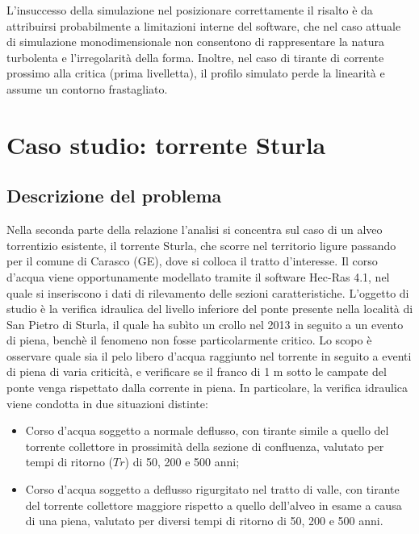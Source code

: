 \documentclass[12pt]{article} %
\begin{document}
\noindent L’insuccesso della simulazione nel posizionare correttamente il risalto è da attribuirsi probabilmente a limitazioni interne del software, che nel caso attuale di simulazione monodimensionale non consentono di rappresentare la natura turbolenta e l'irregolarità della forma. Inoltre, nel caso di tirante di corrente prossimo alla critica (prima livelletta), il profilo simulato perde la linearità e assume un contorno frastagliato.

\newpage

\section{Caso studio: torrente Sturla}
\subsection{Descrizione del problema}
\noindent Nella seconda parte della relazione l’analisi si concentra sul caso di un alveo torrentizio esistente, il torrente Sturla, che scorre nel territorio ligure passando per il comune di Carasco (GE), dove si colloca il tratto d’interesse. Il corso d’acqua viene opportunamente modellato tramite il software Hec-Ras 4.1, nel quale si inseriscono i dati di rilevamento delle sezioni caratteristiche.
L’oggetto di studio è la verifica idraulica del livello inferiore del ponte presente nella località di San Pietro di Sturla, il quale ha subìto un crollo nel 2013 in seguito a un evento di piena, benchè il fenomeno non fosse particolarmente critico. Lo scopo è osservare quale sia il pelo libero d’acqua raggiunto nel torrente in seguito a eventi di piena di varia criticità, e verificare se il franco di 1 m sotto le campate del ponte venga rispettato dalla corrente in piena.
In particolare, la verifica idraulica viene condotta in due situazioni distinte:

\begin{itemize}
    \item Corso d'acqua soggetto a normale deflusso, con tirante simile a quello del torrente collettore in prossimità della sezione di confluenza, valutato per tempi di ritorno ($Tr$) di 50, 200 e 500 anni;
    \item Corso d'acqua soggetto a deflusso rigurgitato nel tratto di valle, con tirante del torrente collettore maggiore rispetto a quello dell'alveo in esame a causa di una piena, valutato per diversi tempi di ritorno di 50, 200 e 500 anni.
\end{itemize}
\end{document}
